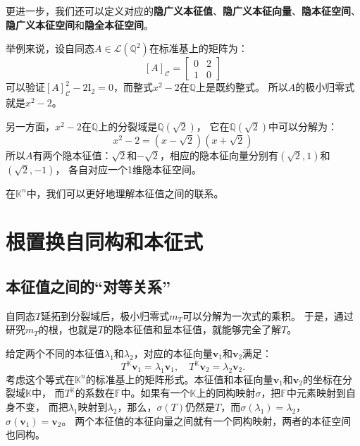 \documentclass[12pt,UTF8]{ctexbook}
\begin{document}
更进一步，我们还可以定义对应的\textbf{隐广义本征值}、\textbf{隐广义本征向量}、\textbf{隐本征空间}、\textbf{隐广义本征空间}和\textbf{隐全本征空间}。

举例来说，设自同态$A\in\mathcal{L}\left(\mathbb{Q}^2\right)$在标准基上的矩阵为：
$$ [A]_\mathcal{C} = \begin{bmatrix} 0 & 2 \\ 1 & 0 \end{bmatrix}$$
可以验证$[A]_\mathcal{C}^2 - 2\mathrm{I}_2 = 0$，而整式$x^2 - 2$在$\mathbb{Q}$上是既约整式。
所以$A$的极小归零式就是$x^2 - 2$。

另一方面，$x^2 - 2$在$\mathbb{Q}$上的分裂域是$\mathbb{Q}(\sqrt{2})$，
它在$\mathbb{Q}(\sqrt{2})$中可以分解为：
$$ x^2 - 2 = (x - \sqrt{2})(x + \sqrt{2})$$
所以$A$有两个隐本征值：$\sqrt{2}$和$-\sqrt{2}$，相应的隐本征向量分别有$(\sqrt{2}, 1)$和$(\sqrt{2}, -1)$，
各自对应一个1维隐本征空间。

在$\mathbb{K}^n$中，我们可以更好地理解本征值之间的联系。

\section{根置换自同构和本征式}
\subsection{本征值之间的“对等关系”}
自同态$T$延拓到分裂域后，极小归零式$m_T$可以分解为一次式的乘积。
于是，通过研究$m_T$的根，也就是$T$的隐本征值和显本征值，就能够完全了解$T$。

给定两个不同的本征值$\lambda_1$和$\lambda_2$，对应的本征向量$\mathbf{v}_1$和$\mathbf{v}_2$满足：
$$T^{\mathbb{K}}\mathbf{v}_1 = \lambda_1\mathbf{v}_1, \quad T^{\mathbb{K}}\mathbf{v}_2 = \lambda_2 \mathbf{v}_2.$$
考虑这个等式在$\mathbb{K}^n$的标准基上的矩阵形式。本征值和本征向量$\mathbf{v}_1$和$\mathbf{v}_2$的坐标在分裂域$\mathbb{K}$中，
而$T^{\mathbb{K}}$的系数在$\mathbb{F}$中。如果有一个$\mathbb{K}$上的同构映射$\sigma$，把$\mathbb{F}$中元素映射到自身不变，
而把$\lambda_1$映射到$\lambda_2$，那么，$\sigma(T)$仍然是$T$，而$\sigma(\lambda_1) = \lambda_2$，$\sigma(\mathbf{v}_1) = \mathbf{v}_2$。
两个本征值的本征向量之间就有一个同构映射，两者的本征空间也同构。
\end{document}
